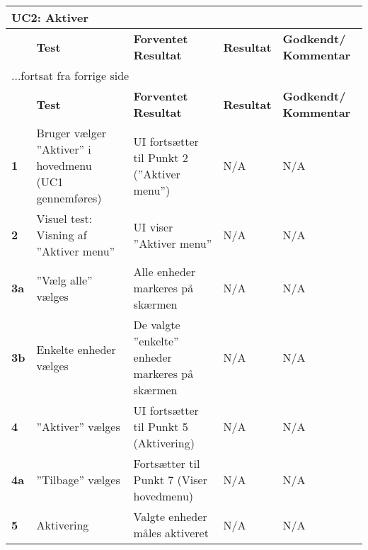 
\begin{center}
\begin{longtable}{|p{}|p{}|p{}|p{}|p{}|} %
\hline
\multicolumn{5}{|l|}{\textbf{UC2: Aktiver}} \\ \hline
\multicolumn{1}{|c|}{} &
\textbf{Test} &
\textbf{Forventet \newline Resultat} &
\textbf{Resultat} &
\textbf{Godkendt/ \newline Kommentar} \\ \hline 
\endfirsthead

\multicolumn{5}{l}{...fortsat fra forrige side} \\ \hline 
\multicolumn{1}{|c|}{} &
\textbf{Test} &
\textbf{Forventet \newline Resultat} &
\textbf{Resultat} &
\textbf{Godkendt/ \newline Kommentar} \\ \hline 
\endhead

		
\textbf{1}			&Bruger vælger ''Aktiver'' i hovedmenu (UC1 gennemføres)															
					&UI fortsætter til Punkt 2 (''Aktiver menu'')
					&N/A 
					&N/A \\\hline
					
\textbf{2}			&Visuel test: Visning af ''Aktiver menu''																
					&UI viser ''Aktiver menu''
					&N/A 
					&N/A \\\hline
		
\textbf{3a}			&''Vælg alle'' vælges		
					&Alle enheder markeres på skærmen		 	
					&N/A 
					&N/A \\\hline

\textbf{3b}			&Enkelte enheder vælges
					&De valgte ''enkelte'' enheder markeres på skærmen
					&N/A 
					&N/A \\\hline

\textbf{4}			&''Aktiver'' vælges			
					&UI fortsætter til Punkt 5 (Aktivering)
					&N/A 
					&N/A \\\hline
					
\textbf{4a}			&''Tilbage'' vælges			
					&Fortsætter til Punkt 7 (Viser hovedmenu)
					&N/A 
					&N/A \\\hline

\textbf{5}			&Aktivering			
					&Valgte enheder måles aktiveret
					&N/A 
					&N/A \\\hline
															

\end{longtable}
\end{center}
